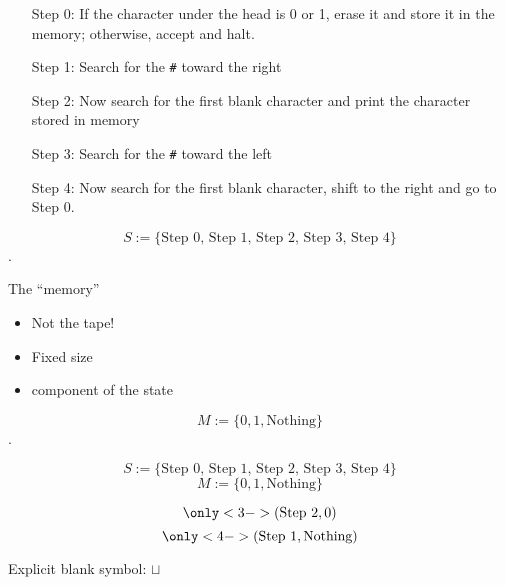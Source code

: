 \documentclass[
  ignorenonframetext,
]{beamer}
\date{}
\begin{document}
\begin{frame}[fragile]
\protect\hypertarget{the-steps}{}

\begin{enumerate}
\item[Step 0:] If the character under the head is 0 or 1, erase it and
store it in the memory; otherwise, accept and halt.\\\pause
\item[Step 1:] Search for the \texttt{\#} toward the right\\\pause
\item[Step 2:] Now search for the first blank character and print the
character stored in memory\\\pause
\item[Step 3:] Search for the \texttt{\#} toward the left\\\pause
\item[Step 4:] Now search for the first blank character, shift to the
right and go to Step 0.\pause
\end{enumerate}

\[S := \{\text{Step 0, Step 1, Step 2, Step 3, Step 4}\}\].

\end{frame}

\begin{frame}{The ``memory''}
\protect\hypertarget{the-memory}{}

\begin{itemize}
\item Not the tape!\pause
\item Fixed size\pause
\item component of the state\pause
\end{itemize}

\[M :=\{ 0, 1, \text{Nothing} \}\].

\end{frame}

\begin{frame}
\protect\hypertarget{the-states}{}

\[S := \{\text{Step 0, Step 1, Step 2, Step 3, Step 4}\}\]
\[M :=\{ 0, 1, \text{Nothing} \}\]


\[\only<3->{(\text{Step 2}, 0)}\]
\[\only<4->{(\text{Step 1}, \text{Nothing})}\]

\end{frame}

\begin{frame}
Explicit blank symbol: \(\sqcup\) 
\end{frame}
\end{document}
